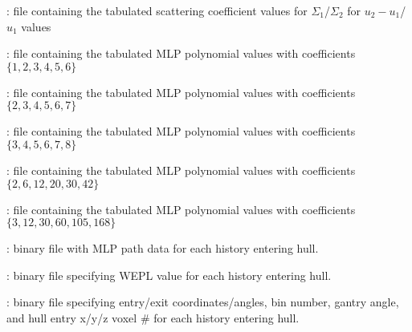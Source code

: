 \item {} : file containing the tabulated scattering coefficient values for $\Sigma_1$/$\Sigma_2$ for $u_2-u_1$/$u_1$ values
\item {} : file containing the tabulated MLP polynomial values with coefficients $\{1,2,3,4,5,6\}$
\item {} : file containing the tabulated MLP polynomial values with coefficients $\{2,3,4,5,6,7\}$
\item {} : file containing the tabulated MLP polynomial values with coefficients $\{3,4,5,6,7,8\}$
\item {} : file containing the tabulated MLP polynomial values with coefficients $\{2,6,12,20,30,42\}$
\item {} : file containing the tabulated MLP polynomial values with coefficients $\{3,12,30,60,105,168\}$
\item {} : binary file with MLP path data for each history entering hull.
\item {} : binary file specifying WEPL value for each history entering hull.
\item {} : binary file specifying entry/exit coordinates/angles, bin number, gantry angle, and hull entry x/y/z voxel \# for each history entering hull.
